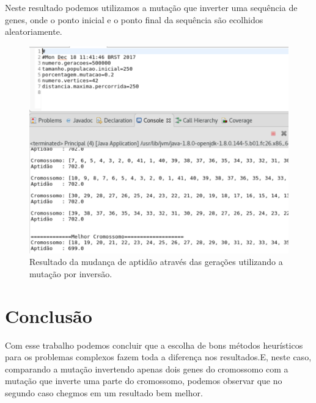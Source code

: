 \documentclass[
article,			%
11pt,				%
oneside,			%
a4paper,			%
english,			%
brazil,				%
sumario=tradicional
]{article}
\begin{document}
	Neste resultado podemos utilizamos a mutação que inverter uma sequência de genes, onde o ponto inicial e o ponto final da sequência são ecolhidos aleatoriamente.

	\begin{figure}[H]
		\centering
		\includegraphics[width=1\textwidth]{Figuras/resultado-inversao.png}
		\caption{Resultado da mudança de aptidão através das gerações utilizando a mutação por inversão.}
	\end{figure}

	
	\section{Conclusão}
	
	Com esse trabalho podemos concluir que a escolha de bons métodos heurísticos para os problemas complexos fazem toda a diferença nos resultados.E, neste caso, comparando a mutação invertendo apenas dois genes do cromossomo com a mutação que inverte uma parte do cromossomo, podemos observar que no segundo caso chegmos em um resultado bem melhor.
\end{document}

